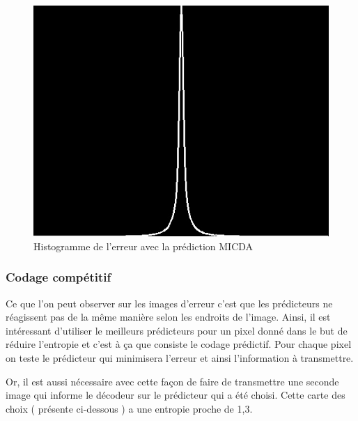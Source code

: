 \documentclass[12pt]{report}
\begin{document}
\begin{figure}[H]
\begin{center}
\includegraphics[scale=0.4]{../ImageRes/HistogrammeErreurMICDAQ1.jpg} 
\caption{Histogramme de l'erreur avec la prédiction MICDA}
\end{center}
\end{figure}

\subsubsection{Codage compétitif}

Ce que l'on peut observer sur les images d'erreur c'est que les prédicteurs ne réagissent pas de la même manière selon les endroits de l'image. Ainsi, il est intéressant d'utiliser le meilleurs prédicteurs pour un pixel donné dans le but de réduire l'entropie et c'est à ça que consiste le codage prédictif. Pour chaque pixel on teste le prédicteur qui minimisera l'erreur et ainsi l'information à transmettre.

Or, il est aussi nécessaire avec cette façon de faire de transmettre une seconde image qui informe le décodeur sur le prédicteur qui a été choisi. Cette carte des choix ( présente ci-dessous ) a une entropie proche de 1,3.
\end{document}
